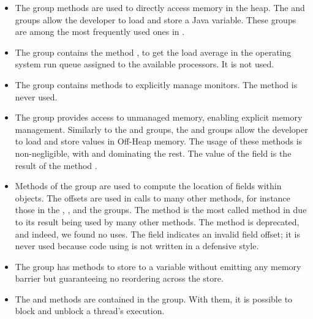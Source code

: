\begin{itemize}
\item The  group methods are used to directly access memory in the \java{} heap. The  and  groups allow the developer to load and store a Java variable. These groups are among the most frequently used ones in \unsafe{}.

\item The  group contains the method , to get the load average in the operating system run queue assigned to the available processors. It is not used.

\item The  group contains methods to explicitly manage \java{} monitors.
The  method is never used.

\item The  group provides access to unmanaged memory, enabling explicit memory management. Similarly to the  and  groups, the  and  groups allow the developer to load and store values in Off-Heap memory. The usage of these methods is non-negligible, with  and  dominating the rest. The value of the  field is the result of the method .

\item Methods of the  group are used to compute the location of fields within \java{} objects. The offsets are used in calls to many other \smu{} methods, for instance those in the , , and the  groups. The method  is the most called method in \smu{} due to its result being used by many other \smu{} methods. The  method is deprecated, and indeed, we found no uses.
The  field indicates an invalid field offset; it is never used because code using  is not written in a defensive style.


\item 
The  group has methods to store to a \java{} variable without emitting any memory barrier but guaranteeing no reordering across the store.

\item The  and  methods are contained in the  group. With them, it is possible to block and unblock a thread's execution.


\end{itemize}
